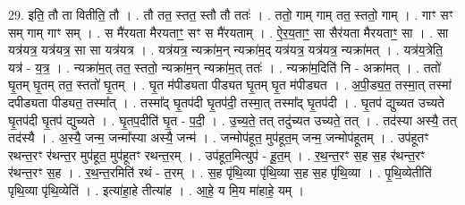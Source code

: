 \documentclass[17pt]{extarticle}
\begin{document}
29. इति॒ तौ ता वितीति॒ तौ । . तौ तत॒ स्तत॒ स्तौ तौ ततः॑ । . ततो॒ गाम् गाम् तत॒ स्ततो॒ गाम् । . गाꣳ सꣳ सम् गाम् गाꣳ सम् । . स मै॑रयता मैरयताꣳ॒॒ सꣳ स मै॑रयताम् । . ऐ॒र॒य॒ताꣳ॒॒ सा सैर॑यता मैरयताꣳ॒॒ सा । . सा यत्र॑यत्र॒ यत्र॑यत्र॒ सा सा यत्र॑यत्र । . यत्र॑यत्र॒ न्यक्रा॑म॒न् न्यक्रा॑म॒द् यत्र॑यत्र॒ यत्र॑यत्र॒ न्यक्रा॑मत् । . यत्र॑य॒त्रेति॒ यत्र॑ - य॒त्र॒ । . न्यक्रा॑म॒त् तत॒ स्ततो॒ न्यक्रा॑म॒न् न्यक्रा॑म॒त् ततः॑ । . न्यक्रा॑म॒दिति॑ नि - अक्रा॑मत् । . ततो॑ घृ॒तम् घृ॒तम् तत॒ स्ततो॑ घृ॒तम् । . घृ॒त म॑पीड्यता पीड्यत घृ॒तम् घृ॒त म॑पीड्यत । . अ॒पी॒ड्य॒त॒ तस्मा॒त् तस्मा॑ दपीड्यता पीड्यत॒ तस्मा᳚त् । . तस्मा᳚द् घृ॒तप॑दी घृ॒तप॑दी॒ तस्मा॒त् तस्मा᳚द् घृ॒तप॑दी । . घृ॒तप॑ द्युच्यत उच्यते घृ॒तप॑दी घृ॒तप॑ द्युच्यते । . घृ॒तप॒दीति॑ घृ॒त - प॒दी॒ । . उ॒च्य॒ते॒ तत् तदु॑च्यत उच्यते॒ तत् । . तद॑स्या अस्यै॒ तत् तद॑स्यै । . अ॒स्यै॒ जन्म॒ जन्मा᳚स्या अस्यै॒ जन्म॑ । . जन्मोप॑हूत॒ मुप॑हूत॒म् जन्म॒ जन्मोप॑हूतम् । . उप॑हूतꣳ रथन्त॒रꣳ र॑थन्त॒र मुप॑हूत॒ मुप॑हूतꣳ रथन्त॒रम् । . उप॑हूत॒मित्युप॑ - हू॒त॒म् । . र॒थ॒न्त॒रꣳ स॒ह स॒ह र॑थन्त॒रꣳ र॑थन्त॒रꣳ स॒ह । . र॒थ॒न्त॒रमिति॑ रथं - त॒रम् । . स॒ह पृ॑थि॒व्या पृ॑थि॒व्या स॒ह स॒ह पृ॑थि॒व्या । . पृ॒थि॒व्येतीति॑ पृथि॒व्या पृ॑थि॒व्येति॑ । . इत्या॑हा॒हे तीत्या॑ह । . आ॒हे॒ य मि॒य मा॑हाहे॒ यम् । \newline
\end{document}
